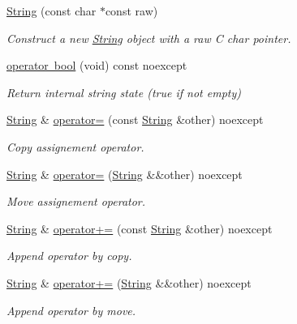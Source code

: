 \begin{DoxyCompactItemize}
\mbox{\hyperlink{classo_a_1_1_string_adee64db6ad1f06dc35c6e960811d3734}{String}} (const char $\ast$const raw)
\begin{DoxyCompactList}\small\item\em Construct a new \mbox{\hyperlink{classo_a_1_1_string}{String}} object with a raw C char pointer. \end{DoxyCompactList}\item 
\mbox{\hyperlink{classo_a_1_1_string_abc7b54346e6c161fb0365336cda41957}{operator bool}} (void) const noexcept
\begin{DoxyCompactList}\small\item\em Return internal string state (true if not empty) \end{DoxyCompactList}\item 
\mbox{\hyperlink{classo_a_1_1_string}{String}} \& \mbox{\hyperlink{classo_a_1_1_string_ac979bb3953e566011543bd0ebe78e822}{operator=}} (const \mbox{\hyperlink{classo_a_1_1_string}{String}} \&other) noexcept
\begin{DoxyCompactList}\small\item\em Copy assignement operator. \end{DoxyCompactList}\item 
\mbox{\hyperlink{classo_a_1_1_string}{String}} \& \mbox{\hyperlink{classo_a_1_1_string_ab45f150390030ee04c119399a4c9fbb7}{operator=}} (\mbox{\hyperlink{classo_a_1_1_string}{String}} \&\&other) noexcept
\begin{DoxyCompactList}\small\item\em Move assignement operator. \end{DoxyCompactList}\item 
\mbox{\hyperlink{classo_a_1_1_string}{String}} \& \mbox{\hyperlink{classo_a_1_1_string_a748a9d3de7d14593f24d5e82fc306413}{operator+=}} (const \mbox{\hyperlink{classo_a_1_1_string}{String}} \&other) noexcept
\begin{DoxyCompactList}\small\item\em Append operator by copy. \end{DoxyCompactList}\item 
\mbox{\hyperlink{classo_a_1_1_string}{String}} \& \mbox{\hyperlink{classo_a_1_1_string_a99849336461c58e51681c68acd1fcafc}{operator+=}} (\mbox{\hyperlink{classo_a_1_1_string}{String}} \&\&other) noexcept
\begin{DoxyCompactList}\small\item\em Append operator by move. \end{DoxyCompactList}\item 

\end{DoxyCompactItemize}
